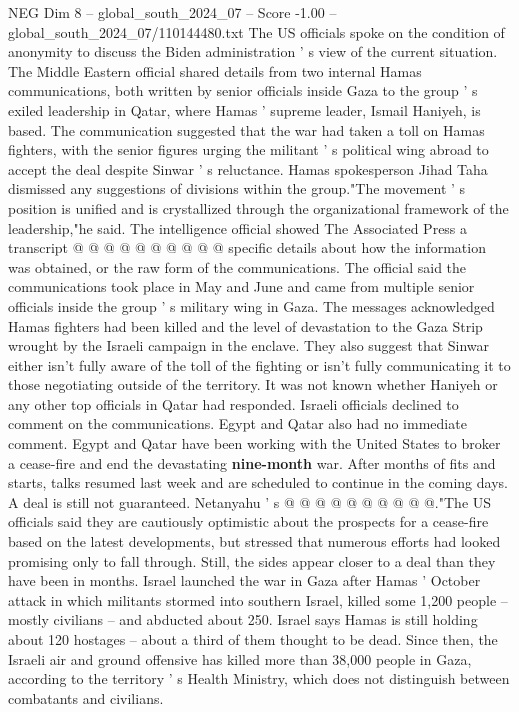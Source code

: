 \begin{textsample}{NEG Dim 8 – global\_south\_2024\_07 – Score -1.00 – global\_south\_2024\_07/110144480.txt}
The US officials spoke on the condition of anonymity to discuss the Biden administration ' s view of the current situation.
The Middle Eastern official shared details from two internal Hamas communications, both written by senior officials inside Gaza to the group ' s exiled leadership in Qatar, where Hamas ' supreme leader, Ismail Haniyeh, is based.
The communication suggested that the war had taken a toll on Hamas fighters, with the senior figures urging the militant ' s political wing abroad to accept the deal despite Sinwar ' s reluctance.
Hamas spokesperson Jihad Taha dismissed any suggestions of divisions within the group."The movement ' s position is unified and is crystallized through the organizational framework of the leadership,"he said.
The intelligence official showed The Associated Press a transcript @ @ @ @ @ @ @ @ @ @ specific details about how the information was obtained, or the raw form of the communications.
The official said the communications took place in May and June and came from multiple senior officials inside the group ' s military wing in Gaza.
The messages acknowledged Hamas fighters had been killed and the level of devastation to the Gaza Strip wrought by the Israeli campaign in the enclave.
They also suggest that Sinwar either isn't fully aware of the toll of the fighting or isn't fully communicating it to those negotiating outside of the territory.
It was not known whether Haniyeh or any other top officials in Qatar had responded.
Israeli officials declined to comment on the communications.
Egypt and Qatar also had no immediate comment.
Egypt and Qatar have been working with the United States to broker a cease-fire and end the devastating \textbf{nine-month} war.
After months of fits and starts, talks resumed last week and are scheduled to continue in the coming days.
A deal is still not guaranteed.
Netanyahu ' s @ @ @ @ @ @ @ @ @ @."The US officials said they are cautiously optimistic about the prospects for a cease-fire based on the latest developments, but stressed that numerous efforts had looked promising only to fall through.
Still, the sides appear closer to a deal than they have been in months.
Israel launched the war in Gaza after Hamas ' October attack in which militants stormed into southern Israel, killed some 1,200 people -- mostly civilians -- and abducted about 250.
Israel says Hamas is still holding about 120 hostages -- about a third of them thought to be dead.
Since then, the Israeli air and ground offensive has killed more than 38,000 people in Gaza, according to the territory ' s Health Ministry, which does not distinguish between combatants and civilians.

\end{textsample}
